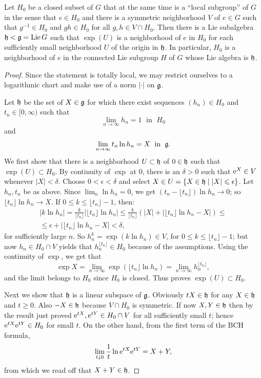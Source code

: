 \begin{thm}[{{\cite[Thm~1.10.6]{DK}}}]\label{thm 1.10.6 DK}
    Let $H_0$ be a closed subset of $G$ that at the same time is a ``local subgroup'' of $G$ in the sense that $e\in H_0$ and there is a symmetric neighborhood $V$ of $e\in G$ such that $g^{-1}\in H_0$ and $gh\in H_0$ for all $g,h\in V\cap H_0$. Then there is a Lie subalgebra $\mathfrak{h}<\mathfrak{g}=\operatorname{Lie} G$ such that $\exp(U)$ is a neighborhood of $e$ in $H_0$ for each sufficiently small neighborhood $U$ of the origin in $\mathfrak{h}$. In particular, $H_0$ is a neighborhood of $e$ in the connected Lie subgroup $H$ of $G$ whose Lie algebra is $\mathfrak{h}$.
\end{thm}
\begin{proof}
    Since the statement is totally local, we may restrict ourselves to a logarithmic chart and make use of a norm $|\cdot |$ on $\mathfrak{g}$.

    Let $\mathfrak{h}$ be the set of $X\in\mathfrak{g}$ for which there exist sequences $(h_n)\in H_0$ and $t_n\in[0,\infty)$ such that 
    \[\lim_{n\to\infty} h_n=1\;\text{ in }\;H_0\] and 
    \[\lim_{n\to\infty} t_n \ln h_n=X\;\text{ in }\;\mathfrak{g}.\]
    We first show that there is a neighborhood $U\subset \mathfrak{h}$ of $0\in\mathfrak{h}$ such that $\exp(U)\subset H_0$. By continuity of $\exp$ at $0$, there is an $\delta>0$ such that $\mathrm{e}^X\in V$ whenever $|X|<\delta$. Choose $0<\epsilon<\delta$ and select $X\in U=\{X\in\mathfrak{h}\mid |X|\leqslant \epsilon\}$. Let $h_n,t_n$ be as above. Since $\lim_n \ln h_n=0$, we get $(t_n-\lfloor t_n\rfloor)\ln h_n\to 0$; so $\lfloor t_n\rfloor \ln h_n\to X$. If $0\leq k\leq \lfloor t_n\rfloor -1$, then:
    \begin{multline}
        |k\ln h_n|=\frac{k}{\lfloor t_n\rfloor}|\lfloor t_n\rfloor \ln h_n|\leq 
    \frac{k}{\lfloor t_n\rfloor}(|X|+|\lfloor t_n\rfloor \ln h_n-X|)\leq \\
    \leq \epsilon+|\lfloor t_n\rfloor \ln h_n-X|<\delta,
    \end{multline}
    for sufficiently large $n$. So $h_n^k=\exp(k\ln h_n)\in V$, for $0\leq k\leq \lfloor t_n\rfloor -1$; but now $h_n\in H_0\cap V$ yields that $h_n^{\lfloor t_n\rfloor}\in H_0$ because of the assumptions. Using the continuity of $\exp$, we get that
    \[\exp X=\lim_{n\to \infty}\exp\left(\lfloor t_n\rfloor \ln h_n\right)=\lim_{n\to\infty} h_n^{\lfloor t_n\rfloor},\]
    and the limit belongs to $H_0$ since $H_0$ is closed. Thus proves $\exp(U)\subset H_0$.

    Next we show that $\mathfrak{h}$ is a linear subspace of $\mathfrak{g}$. Obviously $tX\in\mathfrak{h}$ for any $X\in\mathfrak{h}$ and $t\geq 0$. Also $-X\in\mathfrak{h}$ because $V\cap H_0$ is symmetric. If now $X,Y\in\mathfrak{h}$ then by the result just proved $\mathrm{e}^{tX},\mathrm{e}^{tY}\in H_0\cap V$ for all sufficiently small $t$; hence $\mathrm{e}^{tX}\mathrm{e}^{tY}\in H_0$ for small $t$. On the other hand, from the first term of the BCH formula,
    \[\lim_{t\downarrow 0}\frac{1}{t} \ln \mathrm{e}^{tX}\mathrm{e}^{tY}=X+Y,\]
    from which we read off that $X+Y\in\mathfrak{h}$.


\end{proof}
